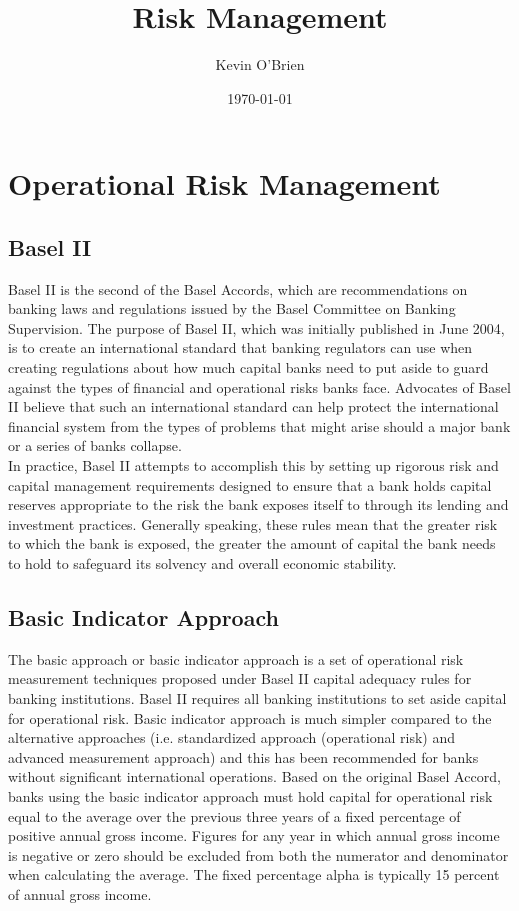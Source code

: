 \documentclass[12pt, a4paper]{report}
\begin{document}
\author{Kevin O'Brien}
\title{Risk Management}
\date{\today}
\maketitle

\tableofcontents \setcounter{tocdepth}{2}


\chapter{Operational Risk Management}

\section{Basel II}
Basel II is the second of the Basel Accords, which are
recommendations on banking laws and regulations issued by the
Basel Committee on Banking Supervision. The purpose of Basel II,
which was initially published in June 2004, is to create an
international standard that banking regulators can use when
creating regulations about how much capital banks need to put
aside to guard against the types of financial and operational
risks banks face. Advocates of Basel II believe that such an
international standard can help protect the international
financial system from the types of problems that might arise
should a major bank or a series of banks collapse. \\ In practice,
Basel II attempts to accomplish this by setting up rigorous risk
and capital management requirements designed to ensure that a bank
holds capital reserves appropriate to the risk the bank exposes
itself to through its lending and investment practices. Generally
speaking, these rules mean that the greater risk to which the bank
is exposed, the greater the amount of capital the bank needs to
hold to safeguard its solvency and overall economic stability.


\section{Basic Indicator Approach}
The basic approach or basic indicator approach is a set of
operational risk measurement techniques proposed under Basel II
capital adequacy rules for banking institutions. Basel II requires
all banking institutions to set aside capital for operational
risk. Basic indicator approach is much simpler compared to the
alternative approaches (i.e. standardized approach (operational
risk) and advanced measurement approach) and this has been
recommended for banks without significant international
operations. Based on the original Basel Accord, banks using the
basic indicator approach must hold capital for operational risk
equal to the average over the previous three years of a fixed
percentage of positive annual gross income. Figures for any year
in which annual gross income is negative or zero should be
excluded from both the numerator and denominator when calculating
the average. The fixed percentage alpha is typically 15 percent
of annual gross income.
\end{document}
